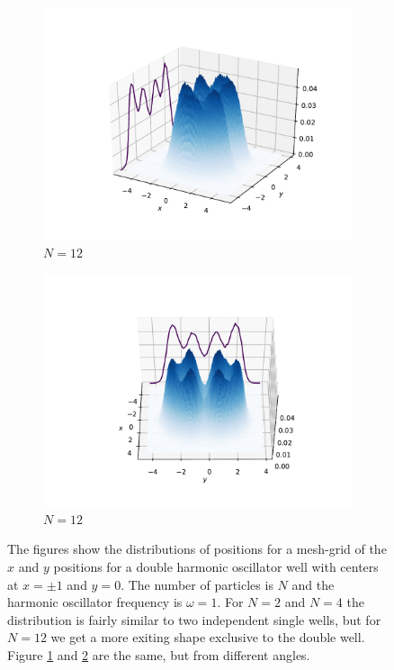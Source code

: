 \documentclass[../main.tex]{subfiles}
\begin{document}
\begin{figure}[!ht]
\medskip
\begin{subfigure}{0.48\textwidth}
\includegraphics[width=\linewidth]{figures/densityDHO/density3D_DHO_N12_Omega1_2d}
\caption{$N=12$} \label{fig:DHO_density3D_c}
\end{subfigure}\hspace*{\fill}
\begin{subfigure}{0.48\textwidth}
\includegraphics[width=\linewidth]{figures/densityDHO/density3D_DHO_N12_Omega1_2d_v2}
\caption{$N=12$} \label{fig:DHO_density3D_d}
\end{subfigure}

\caption{The figures show the distributions of positions for a mesh-grid of the $x$ and $y$ positions for a double harmonic oscillator well with centers at $x=\pm1$ and $y=0$. The number of particles is $N$ and the harmonic oscillator frequency is $\omega=1$. For $N=2$ and $N=4$ the distribution is fairly similar to two independent single wells, but for $N=12$ we get a more exiting shape exclusive to the double well. Figure \ref{fig:DHO_density3D_c} and \ref{fig:DHO_density3D_d} are the same, but from different angles.} \label{fig:DHO_density3D}
\end{figure}
\end{document}
